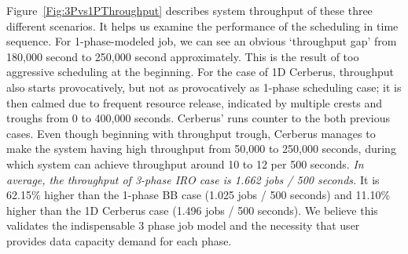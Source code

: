 Figure~\ref{Fig:3Pvs1PThroughput} describes system throughput of these three different scenarios.
It helps us examine the performance of the scheduling in time sequence.
For 1-phase-modeled job, we can see an obvious `throughput gap'
from 180,000 second to 250,000 second approximately.
This is the result of too aggressive scheduling at the beginning.
For the case of 1D Cerberus, throughput also starts provocatively,
but not as provocatively as 1-phase scheduling case;
it is then calmed due to frequent resource release,
indicated by multiple crests and troughs from 0 to 400,000 seconds.
Cerberus' runs counter to the both previous cases.
Even though beginning with throughput trough,
Cerberus manages to make the system having high throughput from 50,000 to 250,000 seconds,
during which system can achieve throughput around 10 to 12 per 500 seconds. 
\textit{In average, the throughput of 3-phase IRO case is 1.662 jobs / 500 seconds.}
It is 62.15\% higher than the 1-phase BB case (1.025 jobs / 500 seconds) and
11.10\% higher than the 1D Cerberus case (1.496 jobs / 500 seconds).
We believe this validates the indispensable 3 phase job model and
the necessity that user provides data capacity demand for each phase.



